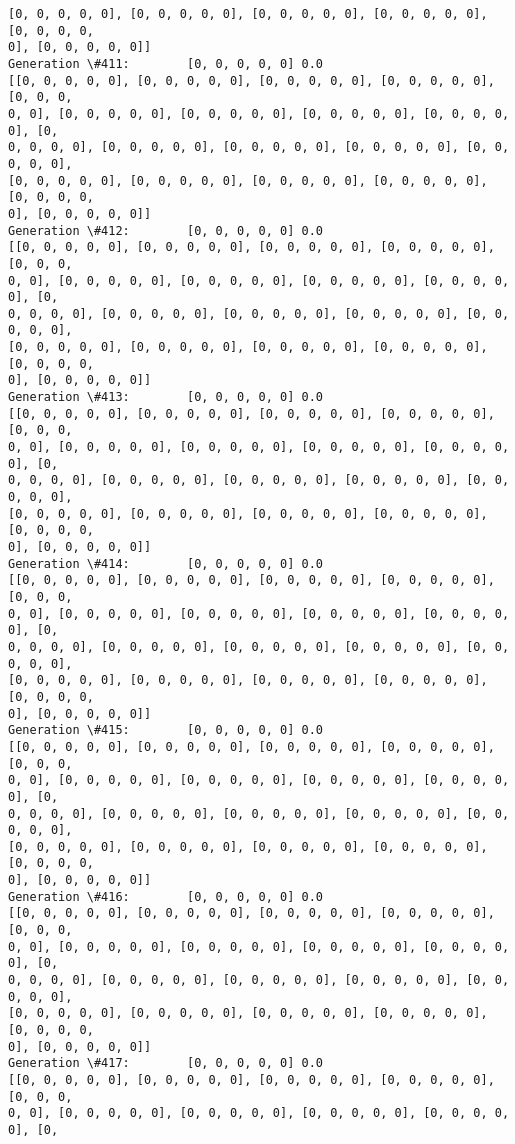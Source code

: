 \documentclass[11pt]{article}
\begin{document}
\begin{Verbatim}[commandchars=\\\{\}]
[0, 0, 0, 0, 0], [0, 0, 0, 0, 0], [0, 0, 0, 0, 0], [0, 0, 0, 0, 0], [0, 0, 0, 0,
0], [0, 0, 0, 0, 0]]
Generation \#411:        [0, 0, 0, 0, 0] 0.0
[[0, 0, 0, 0, 0], [0, 0, 0, 0, 0], [0, 0, 0, 0, 0], [0, 0, 0, 0, 0], [0, 0, 0,
0, 0], [0, 0, 0, 0, 0], [0, 0, 0, 0, 0], [0, 0, 0, 0, 0], [0, 0, 0, 0, 0], [0,
0, 0, 0, 0], [0, 0, 0, 0, 0], [0, 0, 0, 0, 0], [0, 0, 0, 0, 0], [0, 0, 0, 0, 0],
[0, 0, 0, 0, 0], [0, 0, 0, 0, 0], [0, 0, 0, 0, 0], [0, 0, 0, 0, 0], [0, 0, 0, 0,
0], [0, 0, 0, 0, 0]]
Generation \#412:        [0, 0, 0, 0, 0] 0.0
[[0, 0, 0, 0, 0], [0, 0, 0, 0, 0], [0, 0, 0, 0, 0], [0, 0, 0, 0, 0], [0, 0, 0,
0, 0], [0, 0, 0, 0, 0], [0, 0, 0, 0, 0], [0, 0, 0, 0, 0], [0, 0, 0, 0, 0], [0,
0, 0, 0, 0], [0, 0, 0, 0, 0], [0, 0, 0, 0, 0], [0, 0, 0, 0, 0], [0, 0, 0, 0, 0],
[0, 0, 0, 0, 0], [0, 0, 0, 0, 0], [0, 0, 0, 0, 0], [0, 0, 0, 0, 0], [0, 0, 0, 0,
0], [0, 0, 0, 0, 0]]
Generation \#413:        [0, 0, 0, 0, 0] 0.0
[[0, 0, 0, 0, 0], [0, 0, 0, 0, 0], [0, 0, 0, 0, 0], [0, 0, 0, 0, 0], [0, 0, 0,
0, 0], [0, 0, 0, 0, 0], [0, 0, 0, 0, 0], [0, 0, 0, 0, 0], [0, 0, 0, 0, 0], [0,
0, 0, 0, 0], [0, 0, 0, 0, 0], [0, 0, 0, 0, 0], [0, 0, 0, 0, 0], [0, 0, 0, 0, 0],
[0, 0, 0, 0, 0], [0, 0, 0, 0, 0], [0, 0, 0, 0, 0], [0, 0, 0, 0, 0], [0, 0, 0, 0,
0], [0, 0, 0, 0, 0]]
Generation \#414:        [0, 0, 0, 0, 0] 0.0
[[0, 0, 0, 0, 0], [0, 0, 0, 0, 0], [0, 0, 0, 0, 0], [0, 0, 0, 0, 0], [0, 0, 0,
0, 0], [0, 0, 0, 0, 0], [0, 0, 0, 0, 0], [0, 0, 0, 0, 0], [0, 0, 0, 0, 0], [0,
0, 0, 0, 0], [0, 0, 0, 0, 0], [0, 0, 0, 0, 0], [0, 0, 0, 0, 0], [0, 0, 0, 0, 0],
[0, 0, 0, 0, 0], [0, 0, 0, 0, 0], [0, 0, 0, 0, 0], [0, 0, 0, 0, 0], [0, 0, 0, 0,
0], [0, 0, 0, 0, 0]]
Generation \#415:        [0, 0, 0, 0, 0] 0.0
[[0, 0, 0, 0, 0], [0, 0, 0, 0, 0], [0, 0, 0, 0, 0], [0, 0, 0, 0, 0], [0, 0, 0,
0, 0], [0, 0, 0, 0, 0], [0, 0, 0, 0, 0], [0, 0, 0, 0, 0], [0, 0, 0, 0, 0], [0,
0, 0, 0, 0], [0, 0, 0, 0, 0], [0, 0, 0, 0, 0], [0, 0, 0, 0, 0], [0, 0, 0, 0, 0],
[0, 0, 0, 0, 0], [0, 0, 0, 0, 0], [0, 0, 0, 0, 0], [0, 0, 0, 0, 0], [0, 0, 0, 0,
0], [0, 0, 0, 0, 0]]
Generation \#416:        [0, 0, 0, 0, 0] 0.0
[[0, 0, 0, 0, 0], [0, 0, 0, 0, 0], [0, 0, 0, 0, 0], [0, 0, 0, 0, 0], [0, 0, 0,
0, 0], [0, 0, 0, 0, 0], [0, 0, 0, 0, 0], [0, 0, 0, 0, 0], [0, 0, 0, 0, 0], [0,
0, 0, 0, 0], [0, 0, 0, 0, 0], [0, 0, 0, 0, 0], [0, 0, 0, 0, 0], [0, 0, 0, 0, 0],
[0, 0, 0, 0, 0], [0, 0, 0, 0, 0], [0, 0, 0, 0, 0], [0, 0, 0, 0, 0], [0, 0, 0, 0,
0], [0, 0, 0, 0, 0]]
Generation \#417:        [0, 0, 0, 0, 0] 0.0
[[0, 0, 0, 0, 0], [0, 0, 0, 0, 0], [0, 0, 0, 0, 0], [0, 0, 0, 0, 0], [0, 0, 0,
0, 0], [0, 0, 0, 0, 0], [0, 0, 0, 0, 0], [0, 0, 0, 0, 0], [0, 0, 0, 0, 0], [0,

\end{Verbatim}
\end{document}
